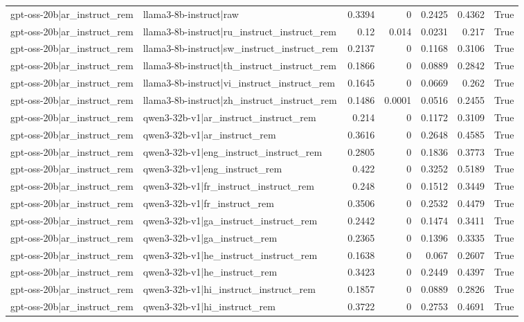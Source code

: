 \begin{table}
\begin{tabular}{l l r r r r l}
gpt-oss-20b|ar_instruct_rem & llama3-8b-instruct|raw & 0.3394 & 0 & 0.2425 & 0.4362 & True \\
gpt-oss-20b|ar_instruct_rem & llama3-8b-instruct|ru_instruct_instruct_rem & 0.12 & 0.014 & 0.0231 & 0.217 & True \\
gpt-oss-20b|ar_instruct_rem & llama3-8b-instruct|sw_instruct_instruct_rem & 0.2137 & 0 & 0.1168 & 0.3106 & True \\
gpt-oss-20b|ar_instruct_rem & llama3-8b-instruct|th_instruct_instruct_rem & 0.1866 & 0 & 0.0889 & 0.2842 & True \\
gpt-oss-20b|ar_instruct_rem & llama3-8b-instruct|vi_instruct_instruct_rem & 0.1645 & 0 & 0.0669 & 0.262 & True \\
gpt-oss-20b|ar_instruct_rem & llama3-8b-instruct|zh_instruct_instruct_rem & 0.1486 & 0.0001 & 0.0516 & 0.2455 & True \\
gpt-oss-20b|ar_instruct_rem & qwen3-32b-v1|ar_instruct_instruct_rem & 0.214 & 0 & 0.1172 & 0.3109 & True \\
gpt-oss-20b|ar_instruct_rem & qwen3-32b-v1|ar_instruct_rem & 0.3616 & 0 & 0.2648 & 0.4585 & True \\
gpt-oss-20b|ar_instruct_rem & qwen3-32b-v1|eng_instruct_instruct_rem & 0.2805 & 0 & 0.1836 & 0.3773 & True \\
gpt-oss-20b|ar_instruct_rem & qwen3-32b-v1|eng_instruct_rem & 0.422 & 0 & 0.3252 & 0.5189 & True \\
gpt-oss-20b|ar_instruct_rem & qwen3-32b-v1|fr_instruct_instruct_rem & 0.248 & 0 & 0.1512 & 0.3449 & True \\
gpt-oss-20b|ar_instruct_rem & qwen3-32b-v1|fr_instruct_rem & 0.3506 & 0 & 0.2532 & 0.4479 & True \\
gpt-oss-20b|ar_instruct_rem & qwen3-32b-v1|ga_instruct_instruct_rem & 0.2442 & 0 & 0.1474 & 0.3411 & True \\
gpt-oss-20b|ar_instruct_rem & qwen3-32b-v1|ga_instruct_rem & 0.2365 & 0 & 0.1396 & 0.3335 & True \\
gpt-oss-20b|ar_instruct_rem & qwen3-32b-v1|he_instruct_instruct_rem & 0.1638 & 0 & 0.067 & 0.2607 & True \\
gpt-oss-20b|ar_instruct_rem & qwen3-32b-v1|he_instruct_rem & 0.3423 & 0 & 0.2449 & 0.4397 & True \\
gpt-oss-20b|ar_instruct_rem & qwen3-32b-v1|hi_instruct_instruct_rem & 0.1857 & 0 & 0.0889 & 0.2826 & True \\
gpt-oss-20b|ar_instruct_rem & qwen3-32b-v1|hi_instruct_rem & 0.3722 & 0 & 0.2753 & 0.4691 & True \\

\end{tabular}
\end{table}
